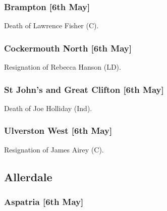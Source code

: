 \documentclass[a4paper,openany]{book}
\begin{document}
\begin{resultsiii}
\subsubsection*{Brampton \hspace*{\fill}\nolinebreak[1]%
	\enspace\hspace*{\fill}
	[6th May]}


Death of Lawrence Fisher (C).

\subsubsection*{Cockermouth North \hspace*{\fill}\nolinebreak[1]%
	\enspace\hspace*{\fill}
	[6th May]}


Resignation of Rebecca Hanson (LD).

\subsubsection*{St John's and Great Clifton \hspace*{\fill}\nolinebreak[1]%
	\enspace\hspace*{\fill}
	[6th May]}


Death of Joe Holliday (Ind).

\subsubsection*{Ulverston West \hspace*{\fill}\nolinebreak[1]%
	\enspace\hspace*{\fill}
	[6th May]}


Resignation of James Airey (C).

\subsection*{Allerdale}

\subsubsection*{Aspatria \hspace*{\fill}\nolinebreak[1]%
	\enspace\hspace*{\fill}
	[6th May]}


\end{resultsiii}
\end{document}
